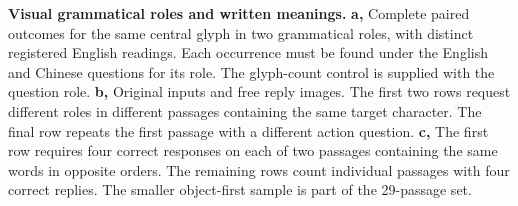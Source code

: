 \textbf{Visual grammatical roles and written meanings.} \textbf{a,} Complete paired outcomes for the same central glyph in two grammatical roles, with distinct registered English readings. Each occurrence must be found under the English and Chinese questions for its role. The glyph-count control is supplied with the question role. \textbf{b,} Original inputs and free reply images. The first two rows request different roles in different passages containing the same target character. The final row repeats the first passage with a different action question. \textbf{c,} The first row requires four correct responses on each of two passages containing the same words in opposite orders. The remaining rows count individual passages with four correct replies. The smaller object-first sample is part of the 29-passage set.
